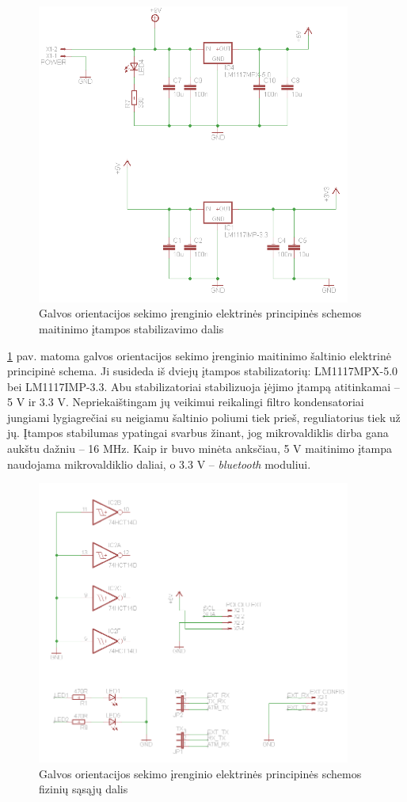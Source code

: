 \documentclass[]{vgtuef}
\begin{document}
{\begin{figure}[htbp]
  \centering
  \includegraphics[width=390px]{img/head_tracker_stabilizer.png}
  \caption{Galvos orientacijos sekimo įrenginio elektrinės principinės schemos maitinimo įtampos stabilizavimo dalis}
  \label{fig:headtracker_stabilizer}
\end{figure}

\ref{fig:headtracker_stabilizer} pav. matoma galvos orientacijos sekimo įrenginio maitinimo šaltinio elektrinė principinė schema. Ji susideda iš dviejų įtampos stabilizatorių:  LM1117MPX-5.0 bei LM1117IMP-3.3. Abu stabilizatoriai stabilizuoja įėjimo įtampą atitinkamai – 5 V ir 3.3 V. Nepriekaištingam jų veikimui reikalingi filtro kondensatoriai jungiami lygiagrečiai su neigiamu šaltinio poliumi tiek prieš, reguliatorius tiek už jų. Įtampos stabilumas ypatingai svarbus žinant, jog mikrovaldiklis dirba gana aukštu dažniu – 16 MHz. Kaip ir buvo minėta anksčiau, 5 V maitinimo įtampa naudojama mikrovaldiklio daliai, o 3.3 V – \textit{bluetooth} moduliui.

\begin{figure}[htbp]
  \centering
  \includegraphics[width=390px]{img/head_tracker_links.png}
  \caption{Galvos orientacijos sekimo įrenginio elektrinės principinės schemos fizinių sąsąjų dalis}
  \label{fig:headtracker_links}
\end{figure}

}
\end{document}
